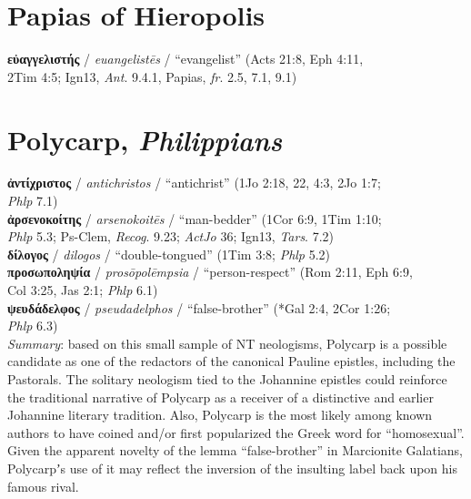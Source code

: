 \section{Papias of Hieropolis}

\noindent{}\textbf{εὐαγγελιστής} / \textit{euangelistēs} / “evangelist” (Acts 21:8, Eph 4:11, %
 \\\makebox[3em][l]{}2Tim 4:5; Ign13, \textit{Ant}. 9.4.1, Papias, \textit{fr}. 2.5, 7.1, 9.1) \\[1mm] %

\section{Polycarp, \textit{Philippians}}

\noindent{}\textbf{ἀντίχριστος} / \textit{antichristos} / “antichrist” (1Jo 2:18, 22, 4:3, 2Jo 1:7; \\ %
 \makebox[3em][l]{} \textit{Phlp} 7.1) \\[0.4mm] %
%
\noindent{}\textbf{ἀρσενοκοίτης} / \textit{arsenokoitēs} / “man-bedder” (1Cor 6:9, 1Tim 1:10; \\ %
 \makebox[3em][l]{} \textit{Phlp} 5.3; Ps-Clem, \textit{Recog}. 9.23; \textit{ActJo} 36; Ign13, \textit{Tars}. 7.2) \\[0.4mm] %
\noindent{}\textbf{δίλογος} / \textit{dilogos} / “double-tongued” (1Tim 3:8; \textit{Phlp} 5.2) \\[0.4mm] %
\noindent{}\textbf{προσωποληψία} / \textit{prosōpolēmpsia} / “person-respect” (Rom 2:11, Eph 6:9, %
\\\makebox[3em][l]{}Col 3:25, Jas 2:1; \textit{Phlp} 6.1) \\[0.4mm] %
\noindent{}\textbf{ψευδάδελφος} / \textit{pseudadelphos} / “false-brother” (*Gal 2:4, 2Cor 1:26; \\\makebox[3em][l]{}\textit{Phlp} 6.3)\\[1mm] %

\noindent{}\textit{Summary}: based on this small sample of NT neologisms, %
Polycarp is a possible candidate as one of the redactors of the canonical Pauline epistles, including the Pastorals. %
The solitary neologism tied to the Johannine epistles could reinforce the traditional %
narrative of Polycarp as a receiver of a distinctive and earlier Johannine literary tradition. %
Also, Polycarp is the most likely among known authors to have coined %
and/or first popularized the Greek word for “homosexual”. %
Given the apparent novelty of the lemma “false-brother” in Marcionite Galatians, %
Polycarpʼs use of it may reflect the inversion of the insulting label back upon his famous rival. \\[1mm] %

